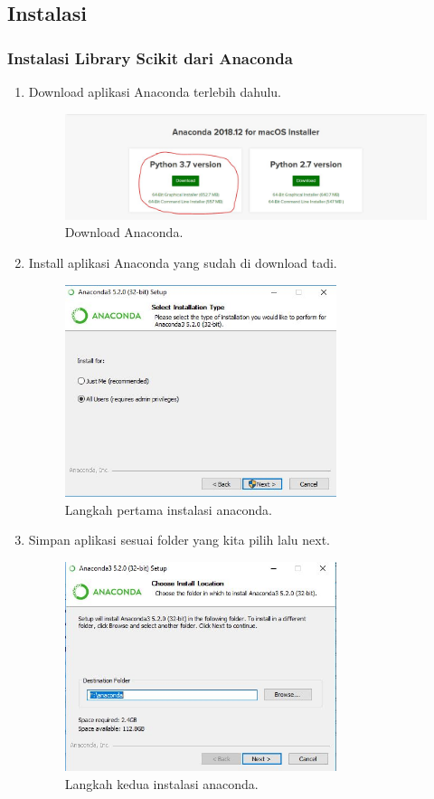 \subsection{Instalasi}
\subsubsection{Instalasi Library Scikit dari Anaconda}
\begin{enumerate}
\item Download aplikasi Anaconda terlebih dahulu.
\begin{figure}[ht]\centerline{\includegraphics[width=1\textwidth]{figures/1.JPG}}\caption{Download Anaconda.}\end{figure}
\item Install aplikasi Anaconda yang sudah di download tadi.
\begin{figure}[ht]\centerline{\includegraphics[width=0.75\textwidth]{figures/2.JPG}}\caption{Langkah pertama instalasi anaconda.}\end{figure}
\item Simpan aplikasi sesuai folder yang kita pilih lalu next.
\begin{figure}[ht]\centerline{\includegraphics[width=0.75\textwidth]{figures/3.JPG}}\caption{Langkah kedua instalasi anaconda.}\end{figure}

\end{enumerate}
